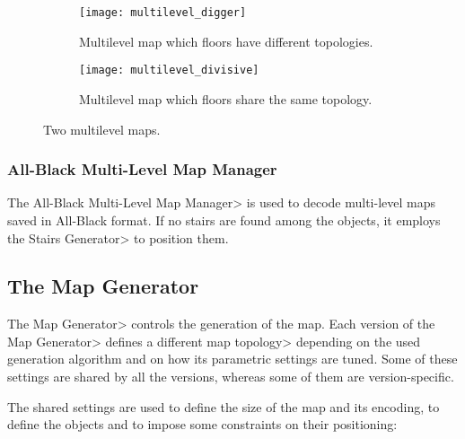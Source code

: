 \begin{figure}[tp]
	\centering
	\hfill
  	\begin{subfigure}[t]{0.45\linewidth}
	\texttt{[image: multilevel\_digger]}
	\caption{Multilevel map which floors have different topologies.}
	\label{fig:multilevel_digger}
 	\end{subfigure}
 	\hfill
  	\begin{subfigure}[t]{0.45\linewidth}
    			\texttt{[image: multilevel\_divisive]}
	\caption{Multilevel map which floors share the same topology.}
	\label{fig:multilevel_divisive}
  	\end{subfigure}
  	\hfill
\caption{Two multilevel maps.}
\end{figure}

\subsubsection{All-Black Multi-Level Map Manager}

The \<All-Black Multi-Level Map Manager> is used to decode multi-level maps saved in All-Black format. If no stairs are found among the objects, it employs the \<Stairs Generator> to position them.


\subsection{The Map Generator}

The \<Map Generator> controls the generation of the map. Each version of the \<Map Generator> defines a different \<map topology> depending on the used generation algorithm and on how its parametric settings are tuned. Some of these settings are shared by all the versions, whereas some of them are version-specific.

\par

The shared settings are used to define the size of the map and its encoding, to define the objects and to impose some constraints on their positioning:

